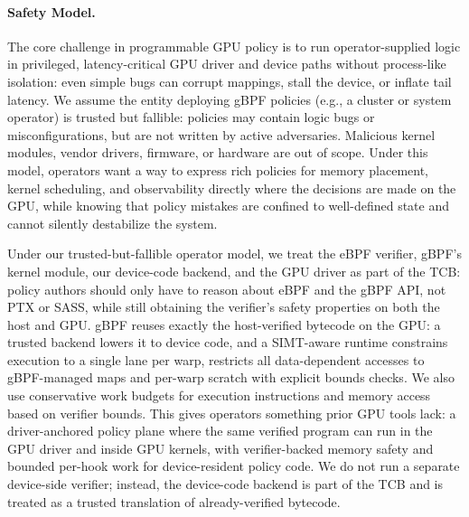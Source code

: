 \paragraph{Safety Model.}
The core challenge in programmable GPU policy is to run operator-supplied logic in privileged, latency-critical GPU driver and device paths without process-like isolation: even simple bugs can corrupt mappings, stall the device, or inflate tail latency. We assume the entity deploying gBPF policies (e.g., a cluster or system operator) is trusted but fallible: policies may contain logic bugs or misconfigurations, but are not written by active adversaries. Malicious kernel modules, vendor drivers, firmware, or hardware are out of scope. Under this model, operators want a way to express rich policies for memory placement, kernel scheduling, and observability directly where the decisions are made on the GPU, while knowing that policy mistakes are confined to well-defined state and cannot silently destabilize the system.

Under our trusted-but-fallible operator model, we treat the eBPF verifier, gBPF's kernel module, our device-code backend, and the GPU driver as part of the TCB: policy authors should only have to reason about eBPF and the gBPF API, not PTX or SASS, while still obtaining the verifier's safety properties on both the host and GPU.
gBPF reuses exactly the host-verified bytecode on the GPU: a trusted backend lowers it to device code, and a SIMT-aware runtime constrains execution to a single lane per warp, restricts all data-dependent accesses to gBPF-managed maps and per-warp scratch with explicit bounds checks. We also use conservative work budgets for execution instructions and memory access based on verifier bounds. This gives operators something prior GPU tools lack: a driver-anchored policy plane where the same verified program can run in the GPU driver and inside GPU kernels, with verifier-backed memory safety and bounded per-hook work for device-resident policy code. We do not run a separate device-side verifier; instead, the device-code backend is part of the TCB and is treated as a trusted translation of already-verified bytecode.



